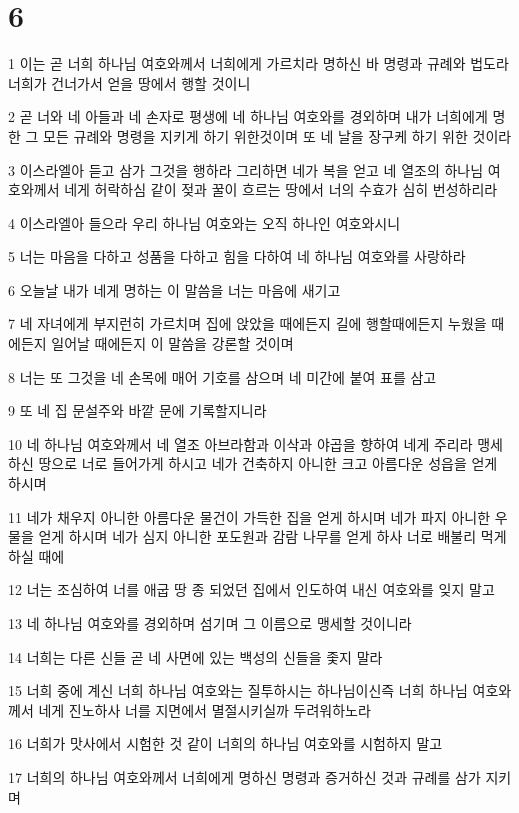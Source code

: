 \chapter{6}

\par 1 이는 곧 너희 하나님 여호와께서 너희에게 가르치라 명하신 바 명령과 규례와 법도라 너희가 건너가서 얻을 땅에서 행할 것이니
\par 2 곧 너와 네 아들과 네 손자로 평생에 네 하나님 여호와를 경외하며 내가 너희에게 명한 그 모든 규례와 명령을 지키게 하기 위한것이며 또 네 날을 장구케 하기 위한 것이라
\par 3 이스라엘아 듣고 삼가 그것을 행하라 그리하면 네가 복을 얻고 네 열조의 하나님 여호와께서 네게 허락하심 같이 젖과 꿀이 흐르는 땅에서 너의 수효가 심히 번성하리라
\par 4 이스라엘아 들으라 우리 하나님 여호와는 오직 하나인 여호와시니
\par 5 너는 마음을 다하고 성품을 다하고 힘을 다하여 네 하나님 여호와를 사랑하라
\par 6 오늘날 내가 네게 명하는 이 말씀을 너는 마음에 새기고
\par 7 네 자녀에게 부지런히 가르치며 집에 앉았을 때에든지 길에 행할때에든지 누웠을 때에든지 일어날 때에든지 이 말씀을 강론할 것이며
\par 8 너는 또 그것을 네 손목에 매어 기호를 삼으며 네 미간에 붙여 표를 삼고
\par 9 또 네 집 문설주와 바깥 문에 기록할지니라
\par 10 네 하나님 여호와께서 네 열조 아브라함과 이삭과 야곱을 향하여 네게 주리라 맹세하신 땅으로 너로 들어가게 하시고 네가 건축하지 아니한 크고 아름다운 성읍을 얻게 하시며
\par 11 네가 채우지 아니한 아름다운 물건이 가득한 집을 얻게 하시며 네가 파지 아니한 우물을 얻게 하시며 네가 심지 아니한 포도원과 감람 나무를 얻게 하사 너로 배불리 먹게 하실 때에
\par 12 너는 조심하여 너를 애굽 땅 종 되었던 집에서 인도하여 내신 여호와를 잊지 말고
\par 13 네 하나님 여호와를 경외하며 섬기며 그 이름으로 맹세할 것이니라
\par 14 너희는 다른 신들 곧 네 사면에 있는 백성의 신들을 좇지 말라
\par 15 너희 중에 계신 너희 하나님 여호와는 질투하시는 하나님이신즉 너희 하나님 여호와께서 네게 진노하사 너를 지면에서 멸절시키실까 두려워하노라
\par 16 너희가 맛사에서 시험한 것 같이 너희의 하나님 여호와를 시험하지 말고
\par 17 너희의 하나님 여호와께서 너희에게 명하신 명령과 증거하신 것과 규례를 삼가 지키며
